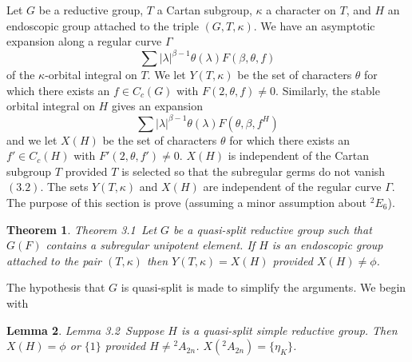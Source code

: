 \documentclass{memo-l}
\newtheorem{theorem}{Theorem}[section]
\newtheorem{lemma}[theorem]{Lemma}
\theoremstyle{definition}
\theoremstyle{remark}
\numberwithin{section}{chapter}
\numberwithin{equation}{chapter}
\begin{document}
   Let $G$ be a reductive group, $T$ a Cartan subgroup, ${\kappa}$ a
character on $T$, and $H$ an endoscopic group attached to the triple
$(G,T,{\kappa})$.  We have an asymptotic expansion along a regular curve
${\Gamma}$
$$
\sum \vert {\lambda}\vert^{{\beta}-1}{\theta}({\lambda})F({\beta},{\theta},f)
$$
of the ${\kappa}$-orbital integral on $T$.  We let $Y(T,{\kappa})$ be the
set of characters ${\theta}$ for which there exists an $f  \in  C_{c}(G)$
with $F(2,{\theta},f) \ne 0$.  Similarly, the stable orbital integral on $H$
gives an expansion
$$
\sum\vert {\lambda}\vert^{{\beta}-1}{\theta}({\lambda})F({\theta},
{\beta},f^{H})
$$
and we let $X(H)$ be the set of characters ${\theta}$ for which there
exists an $f'  \in  C_{c}(H)$ with $F'(2,{\theta},f') \ne 0$.  $X(H)$ is
independent of the Cartan subgroup $T$ provided $T$ is selected so that the
subregular germs do not vanish $(3.2)$.  The sets $Y(T,{\kappa})$ and
$X(H)$ are independent of the regular curve ${\Gamma}$.  The purpose of
this section is prove (assuming a minor assumption about ${}^2E_6$).

\begin{theorem}{Theorem 3.1}\ Let $G$ be a quasi-split reductive group such
that $G(F)$ contains a subregular unipotent element.  If $H$ is an
endoscopic group attached to the pair $(T,{\kappa})$ then $Y(T,{\kappa})  =
X(H)$ provided $X(H)  \ne {\phi}$.
\end{theorem}

\medpagebreak

The hypothesis that $G$ is quasi-split is made to simplify the arguments.
We begin with

\begin{lemma}{Lemma 3.2}\ Suppose $H$ is a quasi-split simple reductive
group.  Then  $X(H) = {\phi}$ or $\{1\}$ provided $H \ne {{}^{2}A_{2n}}$.
$X(^{2}A_{2n})  = \{{\eta}_{K}\}$.
\end{lemma}
\end{document}
